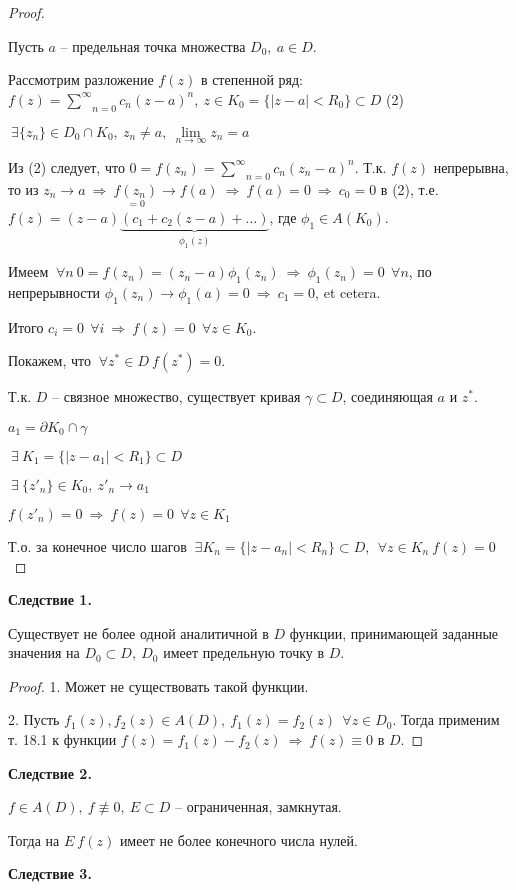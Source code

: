 \documentclass[draft]{report}
\newcommand{\forcenewline}{$\phantom{\mbox{newline}}$\newline}
\newcommand{\dd}{\partial}
\newcommand{\then}{\ \Rightarrow\ }
\newcommand{\msum}[2]{\underset{#1}{\overset{#2}{\sum}}}
\newcommand{\ssum}{\msum{n=0}{\infty}}
\newcommand{\mlim}[1]{\underset{#1}{\lim}}
\newcommand{\g}{\gamma}
\renewcommand{\f}{\phi}
\newcommand{\E}{\ \exists}
\newcommand{\F}{\ \forall}
\theoremstyle{remark}
\begin{document}
\begin{proof}
\forcenewline

Пусть $a$ -- предельная точка множества $D_0,\ a\in D$. 

Рассмотрим разложение $f(z)$ в степенной ряд: $f(z)=\ssum c_n(z-a)^n,\ z\in K_0=\{|z-a|<R_0\}\subset D$ (2)

$\E \{z_n\}\in D_0\cap K_0,\ z_n\neq a,\ \mlim{n\to\infty}z_n=a$

Из (2) следует, что $0=f(z_n)=\ssum c_n(z_n-a)^n$. Т.к. $f(z)$ непрерывна, то из $z_n\to a\then \underset{=0}{f(z_n)}\to f(a)\then f(a)=0\then c_0=0$ в (2), т.е. $f(z)=(z-a)\underset{\f_1(z)}{\underbrace{(c_1+c_2(z-a)+\ldots)}}$, где $\f_1\in A(K_0)$.

Имеем $\F n\ 0=f(z_n)=(z_n-a)\f_1(z_n) \then \f_1(z_n)=0\ \F n$, по непрерывности $\f_1(z_n)\to\f_1(a)=0\then c_1=0$, et cetera.

Итого $c_i=0\ \F i\then f(z)=0\ \F z\in K_0$.

Покажем, что $\F z^*\in D\ f(z^*)=0$.

Т.к. $D$ -- связное множество, существует кривая $\g\subset D$, соединяющая $a$ и $z^*$.

$a_1=\dd K_0\cap\g$

$\E\ K_1=\{|z-a_1|<R_1\}\subset D$

$\E\ \{z'_n\}\in K_0,\ z'_n\to a_1$

$f(z'_n)=0\then f(z)=0\ \F z\in K_1$

Т.о. за конечное число шагов $\E K_n=\{|z-a_n|<R_n\}\subset D,\ \F z\in K_n\ f(z)=0$
\end{proof}

{\bfseries Следствие 1.}

Существует не более одной аналитичной в $D$ функции, принимающей заданные значения на $D_0\subset D,\ D_0$ имеет предельную точку в $D$.
\begin{proof}
1. Может не существовать такой функции.

2. Пусть $f_1(z),f_2(z)\in A(D),\ f_1(z)=f_2(z)\ \F z\in D_0$. Тогда применим т. 18.1 к функции $f(z)=f_1(z)-f_2(z)\then f(z)\equiv 0$ в $D$.
\end{proof}

{\bfseries Следствие 2.}

$f\in A(D),\ f\not\equiv0,\ E\subset D$ -- ограниченная, замкнутая.

Тогда на $E\ f(z)$ имеет не более конечного числа нулей.

{\bfseries Следствие 3.}
\end{document}
